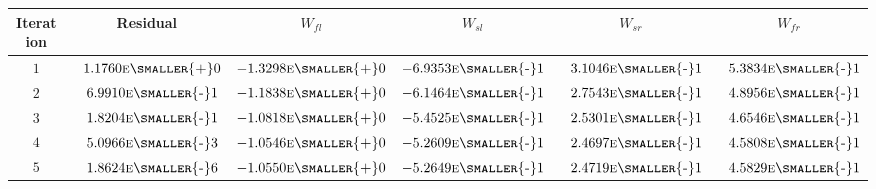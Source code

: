 \begin{tabular*}{\textwidth}{@{\extracolsep{\fill}} cccccc}
\\ 
\hline 
\hline 
Iteration & Residual & $W_{fl}$ & $W_{sl}$ & $W_{sr}$ & $W_{fr}$ \\ 
\hline 
$1$ & $\phantom{-} 1.1760\mbox{\sc{e}\smaller{+}}0$ & $-1.3298\mbox{\sc{e}\smaller{+}}0$ & $-6.9353\mbox{\sc{e}\smaller{-}}1$ & $\phantom{-} 3.1046\mbox{\sc{e}\smaller{-}}1$ & $\phantom{-} 5.3834\mbox{\sc{e}\smaller{-}}1$ \\ 
$2$ & $\phantom{-} 6.9910\mbox{\sc{e}\smaller{-}}1$ & $-1.1838\mbox{\sc{e}\smaller{+}}0$ & $-6.1464\mbox{\sc{e}\smaller{-}}1$ & $\phantom{-} 2.7543\mbox{\sc{e}\smaller{-}}1$ & $\phantom{-} 4.8956\mbox{\sc{e}\smaller{-}}1$ \\ 
$3$ & $\phantom{-} 1.8204\mbox{\sc{e}\smaller{-}}1$ & $-1.0818\mbox{\sc{e}\smaller{+}}0$ & $-5.4525\mbox{\sc{e}\smaller{-}}1$ & $\phantom{-} 2.5301\mbox{\sc{e}\smaller{-}}1$ & $\phantom{-} 4.6546\mbox{\sc{e}\smaller{-}}1$ \\ 
$4$ & $\phantom{-} 5.0966\mbox{\sc{e}\smaller{-}}3$ & $-1.0546\mbox{\sc{e}\smaller{+}}0$ & $-5.2609\mbox{\sc{e}\smaller{-}}1$ & $\phantom{-} 2.4697\mbox{\sc{e}\smaller{-}}1$ & $\phantom{-} 4.5808\mbox{\sc{e}\smaller{-}}1$ \\ 
$5$ & $\phantom{-} 1.8624\mbox{\sc{e}\smaller{-}}6$ & $-1.0550\mbox{\sc{e}\smaller{+}}0$ & $-5.2649\mbox{\sc{e}\smaller{-}}1$ & $\phantom{-} 2.4719\mbox{\sc{e}\smaller{-}}1$ & $\phantom{-} 4.5829\mbox{\sc{e}\smaller{-}}1$ \\ 
\hline 
\end{tabular*} 
